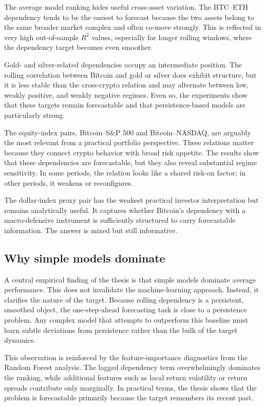 The average model ranking hides useful cross-asset variation. The BTC--ETH dependency tends to be the easiest to forecast because the two assets belong to the same broader market complex and often co-move strongly. This is reflected in very high out-of-sample $R^2$ values, especially for longer rolling windows, where the dependency target becomes even smoother.

Gold- and silver-related dependencies occupy an intermediate position. The rolling correlation between Bitcoin and gold or silver does exhibit structure, but it is less stable than the cross-crypto relation and may alternate between low, weakly positive, and weakly negative regimes. Even so, the experiments show that these targets remain forecastable and that persistence-based models are particularly strong.

The equity-index pairs, Bitcoin--S\&P 500 and Bitcoin--NASDAQ, are arguably the most relevant from a practical portfolio perspective. These relations matter because they connect crypto behavior with broad risk appetite. The results show that these dependencies are forecastable, but they also reveal substantial regime sensitivity. In some periods, the relation looks like a shared risk-on factor; in other periods, it weakens or reconfigures.

The dollar-index proxy pair has the weakest practical investor interpretation but remains analytically useful. It captures whether Bitcoin's dependency with a macro-defensive instrument is sufficiently structured to carry forecastable information. The answer is mixed but still informative.

\subsection{Why simple models dominate}

A central empirical finding of the thesis is that simple models dominate average performance. This does not invalidate the machine-learning approach. Instead, it clarifies the nature of the target. Because rolling dependency is a persistent, smoothed object, the one-step-ahead forecasting task is close to a persistence problem. Any complex model that attempts to outperform this baseline must learn subtle deviations from persistence rather than the bulk of the target dynamics.

This observation is reinforced by the feature-importance diagnostics from the Random Forest analysis. The lagged dependency term overwhelmingly dominates the ranking, while additional features such as local return volatility or return spreads contribute only marginally. In practical terms, the thesis shows that the problem is forecastable primarily because the target remembers its recent past.

